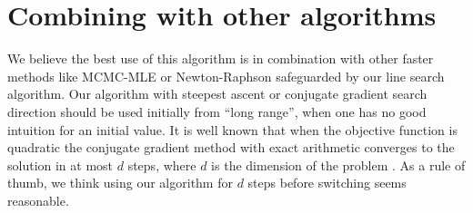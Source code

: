 \section{Combining with other algorithms}
We believe the best use of this algorithm is in combination with other faster methods 
like MCMC-MLE \citep{Geyer:1992}
or Newton-Raphson safeguarded by our line search algorithm.  Our algorithm with 
steepest ascent or conjugate gradient search direction
should be used initially from ``long range'', when one has no good intuition for an 
initial value.
It is well known that when the objective function is quadratic the conjugate gradient 
method with exact arithmetic converges to the solution
in at most $d$ steps, where $d$ is the dimension of the problem \citep{NW}.  As a rule 
of thumb, we think using our 
algorithm for $d$ steps before switching seems reasonable.
